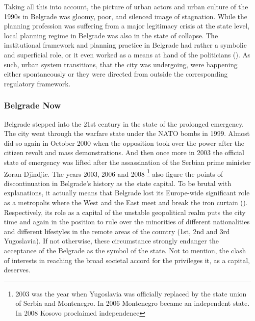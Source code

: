 \documentclass[11pt]{report}
\begin{document}
Taking all this into account, the picture of urban actors and urban culture of the 1990s in Belgrade was gloomy, poor, and silenced image of stagnation.
While the planning profession was suffering from a major legitimacy crisis at the state level, local planning regime in Belgrade was also in the state of collapse.
The institutional framework and planning practice in Belgrade had rather a symbolic and superficial role, or it even worked as a means at hand of the politicians (\href{ref}{\citealt{vujosevic_planning_2006}}). As such, urban system transitions, that the city was undergoing, were happening either spontaneously or they were directed from outside the corresponding regulatory framework.

\subsubsection{Belgrade Now}
Belgrade stepped into the 21st century in the state of the prolonged emergency.
The city went through the warfare state under the NATO bombs in 1999. Almost did so again in October 2000 when the opposition took over the power after the citizen revolt and mass demonstrations.
And then once more in 2003 the official state of emergency was lifted after the assassination of the Serbian prime minister Zoran Djindjic. The years 2003, 2006 and 2008
\footnote{2003 was the year when Yugoslavia was officially replaced by the state union of Serbia and Montenegro. In 2006 Montenegro became an independent state. In 2008 Kosovo proclaimed independence}
also figure the points of discontinuation in Belgrade's history as the state capital.
To be brutal with explanations, it actually means that Belgrade lost its Europe-wide significant role as a metropolis where the West and the East meet and break the iron curtain (\href{ref}{\citealt{grozdanic_belgrade_2008}}).
\\

Respectively, its role as a capital of the unstable geopolitical realm puts the city time and again in the position to rule over the minorities of different nationalities and different lifestyles in the remote areas of the country (1st, 2nd and 3rd Yugoslavia). If not otherwise, these circumstance strongly endanger the acceptance of the Belgrade as the symbol of the state. Not to mention, the clash of interests in reaching the broad societal accord for the privileges it, as a capital, deserves.
\\
\end{document}
